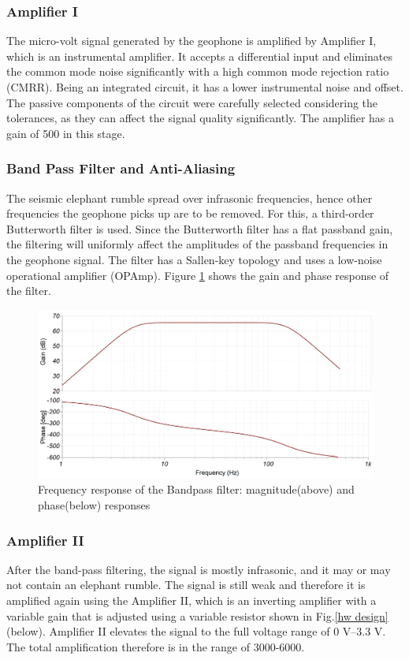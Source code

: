 \documentclass[applsci,article,accept,moreauthors,pdftex]{Definitions/mdpi}
\begin{document}
\subsubsection{Amplifier I}
The micro-volt signal generated by the geophone is amplified by Amplifier I, which is an instrumental amplifier. It accepts a differential input and eliminates the common mode noise significantly with a high common mode rejection ratio (CMRR). Being an integrated circuit, it has a lower instrumental noise and offset. The passive components of the circuit were carefully selected considering the tolerances, as they can affect the signal quality significantly. The amplifier has a gain of 500 in this stage.
\subsubsection{Band Pass Filter and Anti-Aliasing}
The seismic elephant rumble spread over infrasonic frequencies, hence other frequencies the geophone picks up are to be removed. For this, a third-order Butterworth filter is used. Since the Butterworth filter has a flat passband gain, the filtering will uniformly affect the amplitudes of the passband frequencies in the geophone signal. The filter has a Sallen-key topology and uses a low-noise operational amplifier (OPAmp)\cite{zumbahlen2007phase}. Figure \ref{fig:bandpass1} shows the gain and phase response of the filter.
\begin{figure}[h]
	\centering   \includegraphics[width=1\columnwidth]{figures/BodePlot}
	\caption{Frequency response of the Bandpass filter: magnitude(above) and phase(below) responses}
	\label{fig:bandpass1}
\end{figure}
\subsubsection{Amplifier II}
After the band-pass filtering, the signal is mostly infrasonic, and it may or may not contain an elephant rumble. The signal is still weak and therefore it is amplified again using the Amplifier II, which is an inverting amplifier with a variable gain that is adjusted using a variable resistor shown in Fig.\ref{hw design} (below). Amplifier II elevates the signal to the full voltage range of 0 V–3.3 V. The total amplification therefore is in the range of 3000-6000.
\end{document}
